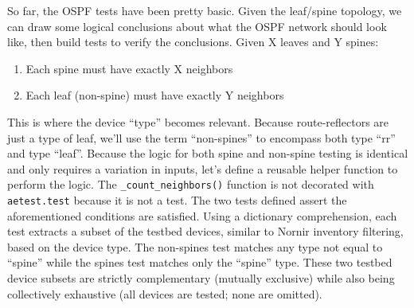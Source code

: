 So far, the OSPF tests have been pretty basic. Given the leaf/spine topology,
we can draw some logical conclusions about what the OSPF network should look
like, then build tests to verify the conclusions. Given X leaves and Y spines:

\begin{enumerate}
  \item Each spine must have exactly X neighbors
  \item Each leaf (non-spine) must have exactly Y neighbors
\end{enumerate}

This is where the device ``type'' becomes relevant. Because route-reflectors
are just a type of leaf, we'll use the term ``non-spines'' to encompass both
type ``rr'' and type ``leaf''. Because the logic for both spine and non-spine
testing is identical and only requires a variation in inputs, let's define a
reusable helper function to perform the logic. The \verb|_count_neighbors()|
function is not decorated with \verb|aetest.test| because it is not a test.
The two tests defined assert the aforementioned conditions are satisfied.
Using a dictionary comprehension, each test extracts a subset of the testbed
devices, similar to Nornir inventory filtering, based on the device type.
The non-spines test matches any type not equal to ``spine'' while the spines
test matches only the ``spine'' type. These two testbed device subsets are
strictly complementary (mutually exclusive) while also being collectively
exhaustive (all devices are tested; none are omitted).

